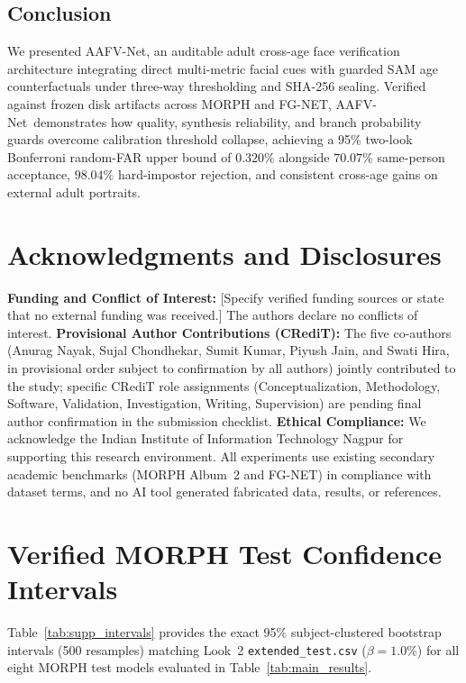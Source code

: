 \documentclass[journal]{IEEEtran}
\newcommand{\sys}{AAFV-Net}
\begin{document}
\subsection{Conclusion}
We presented \sys, an auditable adult cross-age face verification architecture integrating direct multi-metric facial cues with guarded SAM age counterfactuals under three-way thresholding and SHA-256 sealing. Verified against frozen disk artifacts across MORPH and FG-NET, \sys\ demonstrates how quality, synthesis reliability, and branch probability guards overcome calibration threshold collapse, achieving a 95\% two-look Bonferroni random-FAR upper bound of $0.320\%$ alongside $70.07\%$ same-person acceptance, $98.04\%$ hard-impostor rejection, and consistent cross-age gains on external adult portraits.

\section*{Acknowledgments and Disclosures}
\textbf{Funding and Conflict of Interest:} [Specify verified funding sources or state that no external funding was received.] The authors declare no conflicts of interest. \textbf{Provisional Author Contributions (CRediT):} The five co-authors (Anurag Nayak, Sujal Chondhekar, Sumit Kumar, Piyush Jain, and Swati Hira, in provisional order subject to confirmation by all authors) jointly contributed to the study; specific CRediT role assignments (Conceptualization, Methodology, Software, Validation, Investigation, Writing, Supervision) are pending final author confirmation in the submission checklist. \textbf{Ethical Compliance:} We acknowledge the Indian Institute of Information Technology Nagpur for supporting this research environment. All experiments use existing secondary academic benchmarks (MORPH Album~2 and FG-NET) in compliance with dataset terms, and no AI tool generated fabricated data, results, or references.

\appendices
\section{Verified MORPH Test Confidence Intervals}
Table~\ref{tab:supp_intervals} provides the exact 95\% subject-clustered bootstrap intervals (500 resamples) matching Look~2 \texttt{extended\_test.csv} ($\beta = 1.0\%$) for all eight MORPH test models evaluated in Table~\ref{tab:main_results}.





\end{document}
